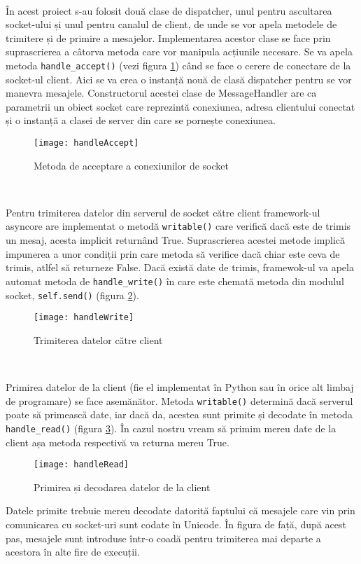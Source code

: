 \documentclass[../IoMusT.tex]{subfiles}
\begin{document}
\\
\par În acest proiect s-au folosit două clase de dispatcher, unul pentru ascultarea socket-ului și unul pentru canalul de client, de unde se vor apela metodele de trimitere și de primire a mesajelor. Implementarea acestor clase se face prin suprascrierea a câtorva metoda care vor manipula acțiunile necesare. Se va apela metoda \verb|handle_accept()| (vezi figura \ref{fig:accept}) când se face o cerere de conectare de la socket-ul client. Aici se va crea o instanță nouă de clasă dispatcher pentru se vor manevra mesajele. Constructorul acestei clase de MessageHandler are ca parametrii un obiect socket care reprezintă conexiunea, adresa clientului conectat și o instanță a clasei de server din care se pornește conexiunea.
\begin{figure}[h]
\centering
\texttt{[image: handleAccept]}
\caption{Metoda de acceptare a conexiunilor de socket}
\label{fig:accept}
\end{figure}
\\
\par Pentru trimiterea datelor din serverul de socket către client framework-ul asyncore are implementat o metodă \verb|writable()| care verifică dacă este de trimis un mesaj, acesta implicit returnând True. Suprascrierea acestei metode implică impunerea a unor condiții prin care metoda să verifice dacă chiar este ceva de trimis, atlfel să returneze False. Dacă există date de trimis, framewok-ul va apela automat metoda de \verb|handle_write()| în care este chemată metoda din modulul socket, \verb|self.send()| (figura \ref{fig:write}).
\begin{figure}[h]
\centering
\texttt{[image: handleWrite]}
\caption{Trimiterea datelor către client}
\label{fig:write}
\end{figure}
\\
\par Primirea datelor de la client (fie el implementat în Python sau în orice alt limbaj de programare) se face asemănător. Metoda \verb|writable()| determină dacă serverul poate să primească date, iar dacă da, acestea sunt primite și decodate în metoda \verb|handle_read()| (figura \ref{fig:read}). În cazul nostru vream să primim mereu date de la client așa metoda respectivă va returna mereu True.
\begin{figure}[h]
\centering
\texttt{[image: handleRead]}
\caption{Primirea și decodarea datelor de la client}
\label{fig:read}
\end{figure}
Datele primite trebuie mereu decodate datorită faptului că mesajele care vin prin comunicarea cu socket-uri sunt codate în Unicode. În figura de față, după acest pas, mesajele sunt introduse într-o coadă pentru trimiterea mai departe a acestora în alte fire de execuții.
\end{document}
